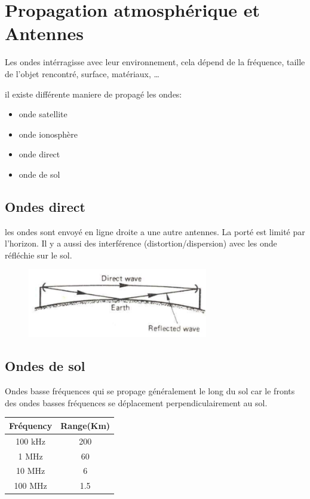 \section{Propagation atmosphérique et Antennes}
	Les ondes intérragisse avec leur environnement, cela dépend de la fréquence, taille de l'objet rencontré, surface, matériaux, \dots
	
	il existe différente maniere de propagé les ondes:
	\begin{itemize}
		\item onde satellite
		\item onde ionosphère
		\item onde direct
		\item onde de sol
	\end{itemize}
	
	
	\subsection{Ondes direct}
		les ondes sont envoyé en ligne droite a une autre antennes. La porté est limité par l'horizon. Il y a aussi des interférence (distortion/dispersion) avec les onde réfléchie sur le sol.
		
		\begin{figure}[htp]
			\centering
			\includegraphics[width=0.7\textwidth]{img/onde_direct.png}
		\end{figure}
	
	\subsection{Ondes de sol}
		Ondes basse fréquences qui se propage généralement le long du sol car le fronts des ondes basses fréquences se déplacement perpendiculairement au sol.
		\begin{center}
			\begin{tabular}{c|c}
			\hline
			Fréquency & Range(Km)\\
			\hline
			100 kHz & 200\\
			1 MHz & 60\\
			10 MHz & 6\\
			100 MHz & 1.5\\
			\hline
		
		\end{tabular}
		\end{center}
		

